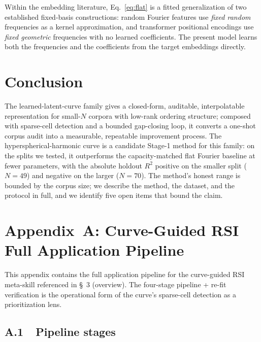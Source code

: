 \documentclass[11pt,a4paper]{article}
\begin{document}
Within the embedding literature, Eq.~\ref{eq:flat} is a fitted generalization of two established fixed-basis constructions: random Fourier features \citep{rahimi2007} use \emph{fixed random} frequencies as a kernel approximation, and transformer positional encodings \citep{tancik2020} use \emph{fixed geometric} frequencies with no learned coefficients. The present model learns both the frequencies and the coefficients from the target embeddings directly.

\section{Conclusion}

The learned-latent-curve family gives a closed-form, auditable, interpolatable representation for small-$N$ corpora with low-rank ordering structure; composed with sparse-cell detection and a bounded gap-closing loop, it converts a one-shot corpus audit into a measurable, repeatable improvement process. The hyperspherical-harmonic curve is a candidate Stage-1 method for this family: on the splits we tested, it outperforms the capacity-matched flat Fourier baseline at fewer parameters, with the absolute holdout $R^2$ positive on the smaller split ($N=49$) and negative on the larger ($N=70$). The method's honest range is bounded by the corpus size; we describe the method, the dataset, and the protocol in full, and we identify five open items that bound the claim.



\appendix

\section{Appendix~A: Curve-Guided RSI \textemdash{} Full Application Pipeline}

This appendix contains the full application pipeline for the curve-guided RSI meta-skill referenced in \S~3 (overview). The four-stage pipeline + re-fit verification is the operational form of the curve's sparse-cell detection as a prioritization lens.

\subsection{A.1~~Pipeline stages}
\end{document}
